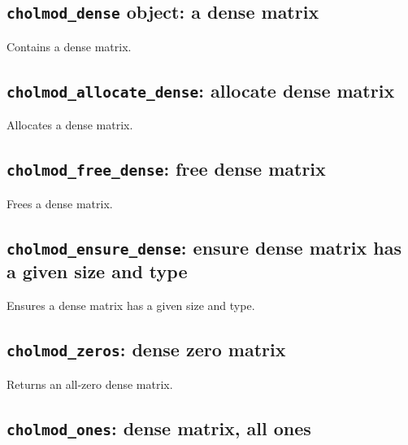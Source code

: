 \documentclass[11pt]{article}
\begin{document}
\subsection{{\tt cholmod\_dense} object: a dense matrix}


Contains a dense matrix.

\subsection{{\tt cholmod\_allocate\_dense}: allocate dense matrix}


Allocates a dense matrix.

\subsection{{\tt cholmod\_free\_dense}: free dense matrix}


Frees a dense matrix.

\subsection{{\tt cholmod\_ensure\_dense}: ensure dense matrix has a given size
and type}


Ensures a dense matrix has a given size and type.


\newpage \subsection{{\tt cholmod\_zeros}: dense zero matrix}


Returns an all-zero dense matrix.

\subsection{{\tt cholmod\_ones}: dense matrix, all ones}
\end{document}
